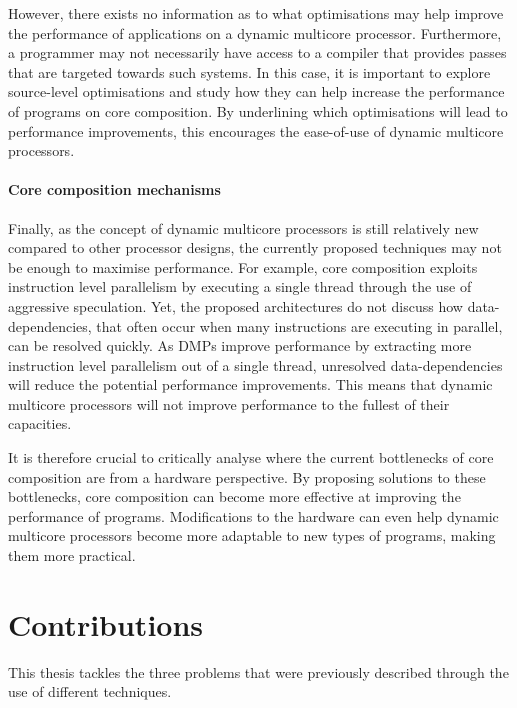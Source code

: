 However, there exists no information as to what optimisations may help improve the performance of applications on a dynamic multicore processor.
Furthermore, a programmer may not necessarily have access to a compiler that provides passes that are targeted towards such systems.
In this case, it is important to explore source-level optimisations and study how they can help increase the performance of programs on core composition.
By underlining which optimisations will lead to performance improvements, this encourages the ease-of-use of dynamic multicore processors.

\paragraph*{Core composition mechanisms} 
Finally, as the concept of dynamic multicore processors is still relatively new compared to other processor designs, the currently proposed techniques may not be enough to maximise performance.
For example, core composition exploits instruction level parallelism by executing a single thread through the use of aggressive speculation.
Yet, the proposed architectures do not discuss how data-dependencies, that often occur when many instructions are executing in parallel, can be resolved quickly.
As DMPs improve performance by extracting more instruction level parallelism out of a single thread, unresolved data-dependencies will reduce the potential performance improvements.
This means that dynamic multicore processors will not improve performance to the fullest of their capacities.

It is therefore crucial to critically analyse where the current bottlenecks of core composition are from a hardware perspective.
By proposing solutions to these bottlenecks, core composition can become more effective at improving the performance of programs.
Modifications to the hardware can even help dynamic multicore processors become more adaptable to new types of programs, making them more practical.


\section{Contributions}
This thesis tackles the three problems that were previously described through the use of different techniques.

